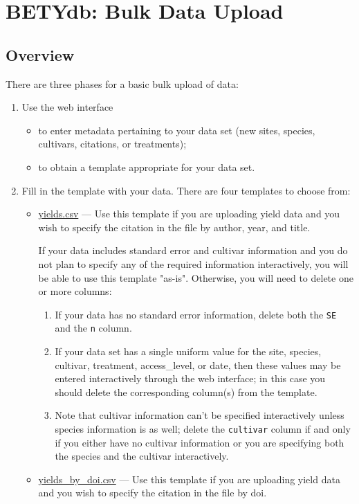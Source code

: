 \section{BETYdb: Bulk Data Upload}

\subsection{Overview}
 
There are three phases for a basic bulk upload of data: 

\begin{enumerate}

\item Use the web interface

      \begin{itemize}
    \item to enter metadata pertaining to your data set (new sites, species, cultivars, citations, or treatments);
    \item to obtain a template appropriate for your data set.
    \end{itemize}
\item Fill in the template with your data. There are four templates to choose from:
\begin{itemize}
\item \href{https://docs.google.com/spreadsheets/d/1maK1uKr6i9KERaYdU5zSiXcBndQoiG4Vgn2DTnqdfbA/export?format=csv&gid=0}{yields.csv} --- Use this template if you are uploading yield data and you wish to specify the citation in the file by author, year, and title.

If your data includes standard error and cultivar information and you do not plan to specify any of the required information interactively, you will be able to use this template "as-is".  Otherwise, you will need to delete one or more columns:
\begin{enumerate}
\item If your data has no standard error information, delete both the \verb|SE| and the \verb|n| column.
\item If your data set has a single uniform value for the site, species, cultivar, treatment, access\_level, or date, then these values may be entered interactively through the web interface; in this case you should delete the corresponding column(s) from the template. \item Note that cultivar information can't be specified interactively unless species information is as well; delete the \verb|cultivar| column if and only if you either have no cultivar information or you are specifying both the species and the cultivar interactively.
\end{enumerate}
\item \href{https://docs.google.com/spreadsheets/d/1ExLosMvX05jHWO9UYVE4Dxcl2ZbUgPc0KYoUPruaOtM/export?format=csv&gid=0}{yields\_by\_doi.csv} --- Use this template if you are uploading yield data and you wish to specify the citation in the file by doi.


\end{itemize}
\end{enumerate}
